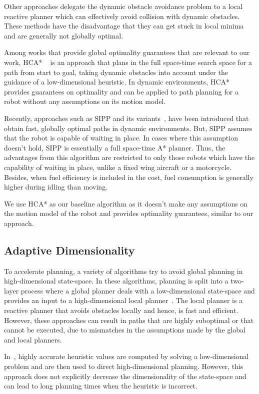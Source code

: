 Other approaches \cite{fox1997dynamic,brock1999high} delegate the dynamic obstacle avoidance problem to a local reactive planner which can effectively avoid collision with dynamic obstacles. These methods have the disadvantage that they can get stuck in local minima and are generally not globally optimal. 

Among works that provide global optimality guarantees that are relevant to our work, HCA* ~\cite{silver2005cooperative} is an approach that plans in the full space-time search space for a path from start to goal, taking dynamic obstacles into account under the guidance of a low-dimensional heuristic. In dynamic environments, HCA* provides guarantees on optimality and can be applied to path planning for a robot without any assumptions on its motion model.

Recently, approaches such as SIPP and its variants~\cite{phillips2011sipp,narayanan2012anytime}, have been introduced that obtain fast, globally optimal paths in dynamic environments. But, SIPP assumes that the robot is capable of waiting in place. 
In cases where this assumption doesn't hold, SIPP is essentially a full space-time A* planner. 
Thus, the advantages from this algorithm are restricted to only those robots which have the capability of waiting in place, unlike a fixed wing aircraft or a motorcycle. 
Besides, when fuel efficiency is included in the cost, fuel consumption is generally higher during idling than moving. 

We use HCA* as our baseline algorithm as it doesn't make any assumptions on the motion model of the robot and provides optimality guarantees, similar to our approach. 

\subsection{Adaptive Dimensionality}
To accelerate planning, a variety of algorithms try to avoid global planning in high-dimensional state-space. 
In these algorithms, planning is split into a two-layer process where a global planner deals with a low-dimensional state-space and provides an input to a high-dimensional local planner~\cite{philippsen2003smooth}. The local planner is a reactive planner that avoids obstacles locally and hence, is fast and efficient. However, these approaches can result in paths that are highly suboptimal or that cannot be executed, due to mismatches in the assumptions made by the global and local planners. 

In~\cite{knepper2006high}, highly accurate heuristic values are computed by solving a low-dimensional problem and are then used to direct high-dimensional planning. However, this approach does not explicitly decrease the dimensionality of the state-space and can lead to long planning times when the heuristic is incorrect. 

